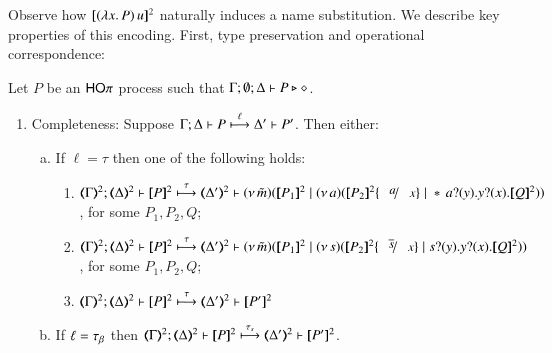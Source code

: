\documentclass[runningheads]{llncs}
\begin{document}
{%

\noi 
Observe how $[\!\![(\lambda x.\,P)\, {u}]\!\!]^2$ naturally induces a name substitution.
We describe key properties of this encoding. First, type preservation and operational correspondence:


\begin{proposition}%
	\label{prop:op_corr_HOp_to_p}
	Let $P$ be an  $\mathsf{HO}\pi$ process such that  $\Gamma; \emptyset; \Delta \vdash P \triangleright \diamond$.
	
\begin{enumerate}[1.]
\item Completeness: Suppose $\Gamma; \Delta \vdash P \stackrel{\ell}{\longmapsto} \Delta' \vdash P'$. Then either:
				\begin{enumerate}[a)]
				\item If $\ell = \tau$ then one of the following holds:
				\begin{enumerate}[-]
					\item	 %
						$
						\horel{\tmap{\Gamma}{2}}{\tmap{\Delta}{2}}{\pmap{P}{2}}
						{\hby{\tau}}
						{\tmap{\Delta'}{2}}{}{\newsp{\tilde{m}}{\pmap{P_1}{2} \Par \newsp{a}
						{\pmap{P_2}{2}\subst{a}{x} \Par \repl{} \binp{a}{y} \binp{y}{x} \pmap{Q}{2}}}}
						$, for some  $P_1, P_2, Q$;

					\item	%
						$
						\horel{\tmap{\Gamma}{2}}{\tmap{\Delta}{2}}{\pmap{P}{2}}
						{\hby{\tau}}
						{\tmap{\Delta'}{2}}{}{\newsp{\tilde{m}}{\pmap{P_1}{2} \Par \newsp{s}
						{\pmap{P_2}{2}\subst{\dual{s}}{x} \Par \binp{s}{y} \binp{y}{x} \pmap{Q}{2}}}}
						$, for some  $P_1, P_2, Q$;

					\item	%
						$\horel{\tmap{\Gamma}{2}}{\tmap{\Delta}{2}}{\pmap{P}{2}}
						{\hby{\tau}}
						{\tmap{\Delta'}{2}}{}{{\pmap{P'}{2} }}
						$

				\end{enumerate}
				\item 	If $\ell = \tau_{\beta}$ then 
						$\horel{\tmap{\Gamma}{2}}{\tmap{\Delta}{2}}{\pmap{P}{2}}
						{\hby{\stau}}
						{\tmap{\Delta'}{2}}{}{{\pmap{P'}{2} }}
						$.
				\end{enumerate}
		

\end{enumerate}
\end{proposition}}
\end{document}

